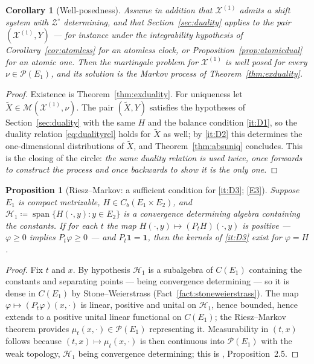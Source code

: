 \documentclass[11pt,a4paper]{article}
\theoremstyle{plain}
\newtheorem{proposition}[theorem]{Proposition}
\newtheorem{corollary}[theorem]{Corollary}
\theoremstyle{definition}
\theoremstyle{remark}
\newcommand{\Cb}{C_b}                          %
\newcommand{\Prob}{\mathcal{P}}                %
\newcommand{\DGP}{\cite{DGP24}}
\newcommand{\XX}{\mathcal{X}}                  %
\newcommand{\ZZ}{\mathcal{Z}}                  %
\newcommand{\Msol}{\mathcal{M}}
\begin{document}
\begin{corollary}[Well-posedness]
  \label{cor:exdualitywellposed}
  Assume in addition that $\XX^{(1)}$ admits a shift system with $\ZZ^\circ$
  determining, and that Section~\ref{sec:duality} applies to the pair
  $(\XX^{(1)}, Y)$ --- for instance under the integrability hypothesis of
  Corollary~\ref{cor:atomless} for an atomless clock, or
  Proposition~\ref{prop:atomicdual} for an atomic one.  Then the martingale problem
  for $\XX^{(1)}$ is
  well posed for every $\nu \in \Prob(E_1)$, and its solution is the Markov
  process of Theorem~\ref{thm:exduality}.
\end{corollary}

\begin{proof}
  Existence is Theorem~\ref{thm:exduality}.  For uniqueness let
  $\tilde X \in \Msol(\XX^{(1)},\nu)$.  The pair $(\tilde X, Y)$ satisfies the
  hypotheses of Section~\ref{sec:duality} with the same $H$ and the balance
  condition \ref{it:D1}, so the duality relation \eqref{eq:dualityrel} holds for
  $\tilde X$ as well; by \ref{it:D2} this determines the one-dimensional
  distributions of $\tilde X$, and Theorem~\ref{thm:absuniq} concludes.  This is
  the closing of the circle: \emph{the same duality relation is used twice, once
  forwards to construct the process and once backwards to show it is the only
  one.}
\end{proof}

\begin{proposition}[Riesz--Markov: a sufficient condition for \ref{it:D3}; \eqref{E3}]
  \label{prop:rieszmarkov}
  Suppose $E_1$ is compact metrizable, $H \in \Cb(E_1 \times E_2)$, and
  $\mathcal{H}_1 \coloneqq \operatorname{span}\{H(\cdot,y) : y \in E_2\}$ is a
  convergence determining algebra containing the constants.  If for each $t$ the
  map $H(\cdot,y) \mapsto (P_tH)(\cdot,y)$ is positive --- $\varphi \geq 0$
  implies $P_t\varphi \geq 0$ --- and $P_t \mathbf{1} = \mathbf{1}$, then the
  kernels of \ref{it:D3} exist for $\varphi = H$.
\end{proposition}

\begin{proof}
  Fix $t$ and $x$.  By hypothesis $\mathcal{H}_1$ is a subalgebra of $C(E_1)$
  containing the constants and separating points --- being convergence
  determining --- so it is dense in $C(E_1)$ by Stone--Weierstrass
  (Fact~\ref{fact:stoneweierstrass}).  The map $\varphi \mapsto (P_t\varphi)(x,\cdot)$
  is linear, positive and unital on $\mathcal{H}_1$, hence bounded, hence extends
  to a positive unital linear functional on $C(E_1)$; the Riesz--Markov theorem
  provides $\mu_t(x,\cdot) \in \Prob(E_1)$ representing it.  Measurability in
  $(t,x)$ follows because $(t,x) \mapsto \mu_t(x,\cdot)$ is then continuous into
  $\Prob(E_1)$ with the weak topology, $\mathcal{H}_1$ being convergence
  determining; this is \DGP, Proposition~2.5.
\end{proof}
\end{document}
